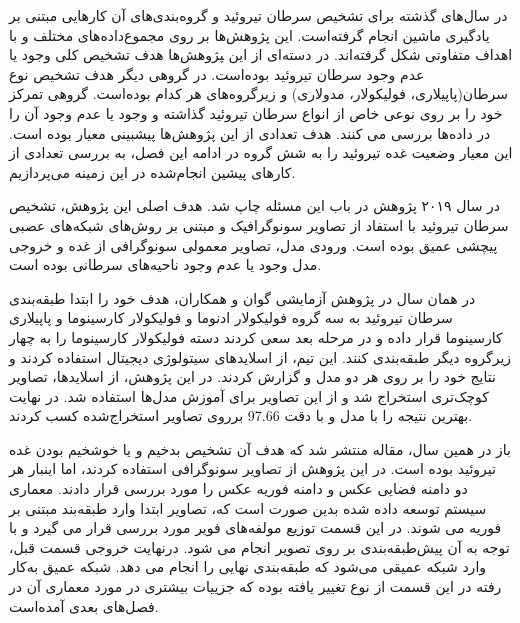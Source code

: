 در سال‌های گذشته برای تشخیص سرطان تیروئید و گروه‌بندی‌های آن‌ کارهایی مبتنی بر یادگیری ماشین انجام گرفته‌است.
این پژوهش‌ها بر روی مجموع‌داده‌های مختلف و با اهداف متفاوتی شکل گرفته‌اند.
در دسته‌ای از این ‍‍پژوهش‌ها هدف تشخیص کلی وجود یا عدم وجود سرطان تیروئید بوده‌است.
در گروهی دیگر هدف تشخیص نوع سرطان(پاپیلاری، فولیکولار، مدولاری) و زیر‌گروه‌های هر کدام بوده‌است.
گروهی تمرکز خود را بر روی نوعی خاص از انواع سرطان تیروئید گذاشته و وجود یا عدم وجود آن را در داده‌ها بررسی می کنند.
هدف تعدادی از این پژوهش‌ها پیشبینی معیار  بوده است. این معیار وضعیت غده تیروئید را به شش گروه 
در ادامه این فصل، به بررسی تعدادی از کارهای پیشین انجام‌شده در این زمینه می‌پردازیم.

در سال ۲۰۱۹ پژوهش \cite{li2019diagnosis} در باب این مسئله چاپ شد.
هدف اصلی این پژوهش، تشخیص سرطان تیروئید با استفاد از تصاویر سونوگرافیک و مبتنی بر روش‌های شبکه‌های عصبی پیچشی عمیق بوده است. ورودی مدل، تصاویر معمولی سونوگرافی از غده و خروجی مدل وجود یا عدم وجود ناحیه‌های سرطانی بوده ‌است.

در همان سال در پژوهش آزمایشی \cite{guan2019deep} گوان و همکاران، هدف خود را ابتدا طبقه‌بندی سرطان تیروئید به سه گروه فولیکولار ادنوما و فولیکولار کارسینوما و پاپیلاری کارسینوما قرار داده و در مرحله بعد سعی کردند دسته فولیکولار کارسینوما را به چهار زیر‌گروه دیگر طبقه‌بندی کنند. این تیم، از اسلاید‌های سیتولوژی دیجیتال استفاده کردند و نتایج خود را بر روی هر دو مدل  و  گزارش کردند.
در این پژوهش، از اسلاید‌ها، تصاویر کوچک‌تری استخراج شد و از این تصاویر برای آموزش مدل‌ها استفاده شد. 
در نهایت بهترین نتیجه را با مدل  و با دقت 97.66 برروی تصاویر استخراج‌شده کسب کردند.

باز در همین سال، مقاله \cite{nguyen2019artificial} منتشر شد که هدف آن تشخیص بد‌خیم و یا خوشخیم بودن غده تیروئید بوده است.
در این پژوهش از تصاویر سونوگرافی استفاده کردند، اما اینبار هر دو دامنه فضایی عکس و دامنه فوریه عکس را مورد بررسی قرار دادند.
معماری سیستم توسعه داده شده بدین صورت است که، تصاویر ابتدا وارد طبقه‌بند مبتنی بر فوریه می شوند.
در این قسمت توزیع مولفه‌های فویر مورد بررسی قرار می گیرد و با توجه به آن پیش‌طبقه‌بندی بر روی تصویر انجام می شود.
درنهایت خروجی قسمت قبل، وارد شبکه عمیقی می‌شود که طبقه‌بندی نهایی را انجام می دهد.
شبکه عمیق به‌کار رفته در این قسمت از نوع  تغییر یافته بوده که جزییات بیشتری در مورد معماری آن در فصل‌های بعدی آمده‌است.

